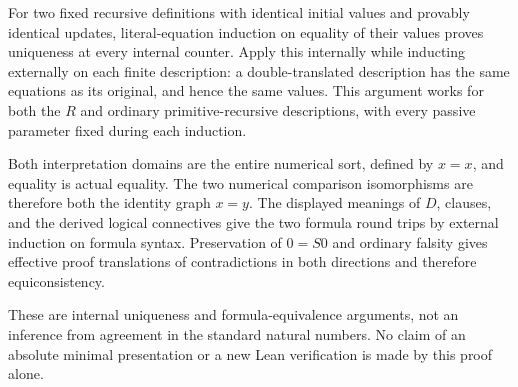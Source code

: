 For two fixed recursive definitions with identical initial values and
provably identical updates, literal-equation induction on equality of their
values proves uniqueness at every internal counter.  Apply this internally
while inducting externally on each finite description: a double-translated
description has the same equations as its original, and hence the same
values.  This argument works for both the $R$ and ordinary primitive-recursive
descriptions, with every passive parameter fixed during each induction.

Both interpretation domains are the entire numerical sort, defined by
$x=x$, and equality is actual equality.  The two numerical comparison
isomorphisms are therefore both the identity graph $x=y$.  The displayed
meanings of $D$, clauses, and the derived logical connectives give the two
formula round trips by external induction on formula syntax.  Preservation
of $0=S0$ and ordinary falsity gives effective proof translations of
contradictions in both directions and therefore equiconsistency.

These are internal uniqueness and formula-equivalence arguments, not an
inference from agreement in the standard natural numbers.  No claim of an
absolute minimal presentation or a new Lean verification is made by this
proof alone.

